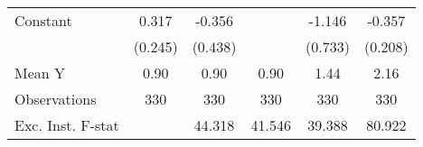 {\begin{tabular}{l*{5}{c}}
\addlinespace
Constant            &       0.317         &      -0.356         &                     &      -1.146         &      -0.357         \\
                    &     (0.245)         &     (0.438)         &                     &     (0.733)         &     (0.208)         \\
\midrule
Mean Y              &        0.90         &        0.90         &        0.90         &        1.44         &        2.16         \\
Observations        &         330         &         330         &         330         &         330         &         330         \\
Exc. Inst. F-stat   &                     &      44.318         &      41.546         &      39.388         &      80.922         \\
\bottomrule
\end{tabular}
}
